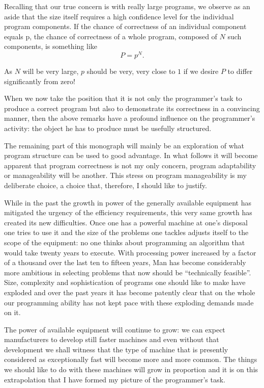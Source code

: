 Recalling that our true concern is with really large programs, we observe as an aside that the size itself requires a high confidence level for the individual program components. If the chance of correctness of an individual component equals p, the chance of correctness of a whole program, composed of $N$ such components, is something like
$$
P=p^N.
$$

As $N$ will be very large, $p$ should be very, very close to $1$ if we desire $P$ to differ significantly from zero!

When we now take the position that it is not only the programmer's task to produce a correct program but also to demonstrate its correctness in a convincing manner, then the above remarks have a profound influence on the programmer's activity: the object he has to produce must be usefully
structured.

The remaining part of this monograph will mainly be an exploration of what program structure can be used to good advantage. In what follows it will become apparent that program correctness is not my only concern, program adaptability or manageability will be another. This stress on program manageability is my deliberate choice, a choice that, therefore, I should like to justify.

While in the past the growth in power of the generally available equipment has mitigated the urgency of the efficiency requirements, this very same growth has created its new difficulties. Once one has a powerful machine at one's disposal one tries to use it and the size of the problems one tackles adjusts itself to the scope of the equipment: no one thinks about programming an algorithm that would take twenty years to execute. With processing power increased by a factor of a thousand over the last ten to fifteen years, Man has become considerably more ambitious in selecting problems that now should be ``technically feasible''. Size, complexity and sophistication of programs one should like to make have exploded and over the past years it has become patently clear that on the whole our programming ability has not kept pace with these exploding demands made on it.

The power of available equipment will continue to grow: we can expect manufacturers to develop still faster machines and even without that development we shall witness that the type of machine that is presently considered as exceptionally fast will become more and more common. The things we should like to do with these machines will grow in proportion and it is on this extrapolation that I have formed my picture of the programmer's task.

